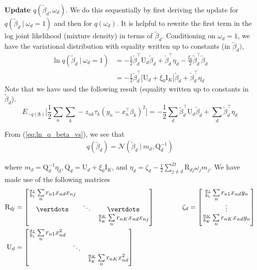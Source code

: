 \documentclass[twoside,11pt]{article}
\newcommand\given[1][]{\:#1\vert\:}
\newcommand{\transpose}[1]{#1^{\intercal}}
\newcommand{\nsum}{\sum\limits_{n}}
\newcommand{\ksum}{\sum\limits_{k}}
\newcommand{\boldbeta}{\boldsymbol\beta}
\newcommand{\betad}{\tilde{\beta}_d}
\newcommand{\umat}{\mathrm{U}}
\newcommand{\qmat}{\mathrm{Q}}
\begin{document}
\textbf{Update $q ( \betad, \omega_d )$}. We do this sequentially by first deriving the update for $q\left(\betad \given \omega_d = 1 \right)$ and then for $q\left( \omega_d \right)$. It is helpful to rewrite the first term in the log joint likelihood (mixture density) in terms of $\betad$. Conditioning on $\omega_d = 1$, we have the variational distribution with equality written up to constants (in $\betad)$, 
\begin{align}
	 \ln q\left(\betad \given \omega_d = 1 \right) &= - \frac{1}{2} \transpose{\betad} \umat_d \betad + \transpose{\betad} \eta_d - \frac{\xi_0}{2} \transpose{\betad} \betad \\
	 &= - \frac{1}{2} \transpose{\betad} \big[ \umat_d +  \xi_0 \mathrm{I}_K\big] \betad + \transpose{\betad} \eta_d \label{eq:ln_q_beta_vs}
\end{align}
Note that we have used the following result (equality written up to constants in $\betad$). 
\begin{equation}
	 E_{-q(\boldbeta)} \Bigg[ \frac{1}{2} \nsum \ksum -z_{nk} \tau_k \left( y_n - \transpose{x_n} \beta_k \right)^2 \Bigg] = - \frac{1}{2} \sum_d \transpose{\betad} \umat_d \betad + \sum_{d} \transpose{\betad} \eta_d
\end{equation}

From (\ref{eq:ln_q_beta_vs}), we see that
\begin{align*}
	q(\betad) = \mathcal{N} \left( \betad \given m_d, \qmat_d^{-1} \right)
\end{align*}

where $m_d = \qmat_d^{-1} \eta_d, \qmat_d = \umat_d + \xi_0 \mathrm{I}_K$, and $\eta_d = \zeta_d - \frac{1}{2} \sum\limits_{j \neq d}^D \mathrm{R}_{dj} \omega_j m_j$. We have made use of the following matrices
\begin{align*}
\mathrm{R}_{dj} & = \begin{bmatrix} 
\frac{a_1}{b_1} \nsum r_{n1} x_{nd}x_{nj}           &          &          \\ 
\vertdots   &  \ddots    & \vertdots \\
            &          & \frac{a_K}{b_K} \nsum r_{nK} x_{nd}x_{nj}        \\
\end{bmatrix} \quad \quad \quad \quad
\zeta_d =  \begin{bmatrix} 
\frac{a_1}{b_1} \nsum r_{n1} x_{nd}y_{n} \\ 
\vdots   \\
\frac{a_K}{b_K} \nsum r_{nK} x_{nd}y_{n} \\
\end{bmatrix} \\
\umat_d & = \begin{bmatrix} 
\frac{a_1}{b_1} \nsum r_{n1} x_{nd}^2            &               &  \\ 
            &  \ddots       &  \\
            &               & \frac{a_K}{b_K} \nsum r_{nK} x_{nd}^2 \\
\end{bmatrix}
\end{align*}
\end{document}
